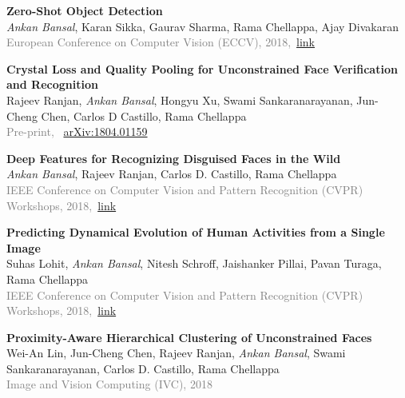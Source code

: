 \documentclass[11pt, a4paper]{article}
\begin{document}
\vspace{4pt}

\textbf{Zero-Shot Object Detection}\\
\textit{Ankan Bansal}, Karan Sikka, Gaurav Sharma, Rama Chellappa, Ajay Divakaran\\
\textcolor{gray}{European Conference on Computer Vision (ECCV), 2018,}~\href{http://openaccess.thecvf.com/content_ECCV_2018/html/Ankan_Bansal_Zero-Shot_Object_Detection_ECCV_2018_paper.html}{link}

\vspace{4pt}

\textbf{Crystal Loss and Quality Pooling for Unconstrained Face Verification and Recognition} \\
Rajeev Ranjan, \textit{Ankan Bansal}, Hongyu Xu, Swami Sankaranarayanan, Jun-Cheng Chen, Carlos D
Castillo, Rama Chellappa\\
\textcolor{gray}{Pre-print,} ~\href{https://arxiv.org/abs/1804.01159}{arXiv:1804.01159}

\vspace{4pt}

\textbf{Deep Features for Recognizing Disguised Faces in the Wild} \\
\textit{Ankan Bansal}, Rajeev Ranjan, Carlos D. Castillo, Rama Chellappa\\
\textcolor{gray}{IEEE Conference on Computer Vision and Pattern Recognition (CVPR) Workshops,
2018,}~\href{http://openaccess.thecvf.com/content_cvpr_2018_workshops/w1/html/Bansal_Deep_Features_for_CVPR_2018_paper.html}{link}

\vspace{4pt}

\textbf{Predicting Dynamical Evolution of Human Activities from a Single Image} \\
Suhas Lohit, \textit{Ankan Bansal}, Nitesh Schroff, Jaishanker Pillai, Pavan Turaga, Rama
Chellappa\\
\textcolor{gray}{IEEE Conference on Computer Vision and Pattern Recognition (CVPR) Workshops,
2018,}~\href{http://openaccess.thecvf.com/content_cvpr_2018_workshops/w10/html/Lohit_Predicting_Dynamical_Evolution_CVPR_2018_paper.html}{link}

\vspace{4pt}

\textbf{Proximity-Aware Hierarchical Clustering of Unconstrained Faces} \\
Wei-An Lin, Jun-Cheng Chen, Rajeev Ranjan, \textit{Ankan Bansal}, Swami Sankaranarayanan, Carlos D.
Castillo, Rama Chellappa\\
\textcolor{gray}{Image and Vision Computing (IVC), 2018}
\end{document}
